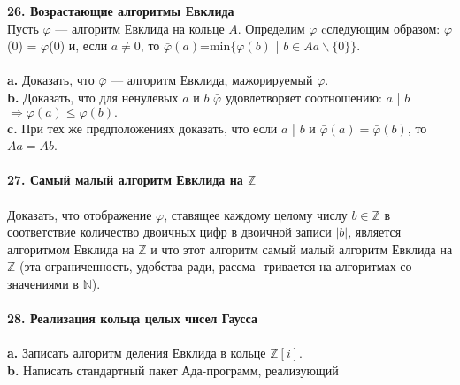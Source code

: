 \noindent\textbf{26. Возрастающие алгоритмы Евклида}\\
\hspace*{10pt} Пусть $\varphi$ — алгоритм Евклида на кольце $A$. Определим $\bar{ \varphi}$  cследующим\linebreak
образом: $\bar{ \varphi}$(0) = $\varphi$(0) и, если $a\neq0$, то $\bar{ \varphi}(a)$=min$\{ \varphi(b)$ | $b \in Aa \backslash \{0\} \}.$\\\\
\hspace*{10pt}\textbf{a.} Доказать, что $\bar{ \varphi}$ — алгоритм Евклида, мажорируемый  $\varphi$.
\\
\hspace*{10pt}\textbf{b.} Доказать, что для ненулевых $a$ и $b$ $\bar{ \varphi}$ удовлетворяет соотношению:\linebreak
$a$ | $b$ $\Rightarrow \bar{ \varphi}(a) \leq \bar{ \varphi}(b).$\\
\hspace*{10pt}\textbf{c.} При тех же предположениях доказать, что если $a$ | $b$ и \linebreak $\bar{ \varphi}(a) = \bar{ \varphi}(b)$, то $Aa=Ab$.\\
\\
\noindent\textbf{27. Самый малый алгоритм Евклида на $\mathbb{Z}$}\\\\
\hspace*{10pt} Доказать, что отображение $\varphi$, ставящее каждому целому числу $b \in\mathbb{Z}$ \linebreak
в соответствие количество двоичных цифр в двоичной записи $|b|$,\linebreak
является алгоритмом Евклида на $\mathbb{Z}$ и что этот алгоритм самый малый\linebreak
алгоритм Евклида на $\mathbb{Z}$ (эта ограниченность, удобства ради, рассма-\linebreak
тривается на алгоритмах со значениями в $\mathbb{N}$).
\\
\\
\noindent\textbf{28. Реализация кольца целых чисел Гаусса}\\\\
\hspace*{10pt}\textbf{a.} Записать алгоритм деления Евклида в кольце $\mathbb{Z}[i]$.\\
\hspace*{10pt}\textbf{b.} Написать стандартный пакет Ада-программ, реализующий\linebreak
